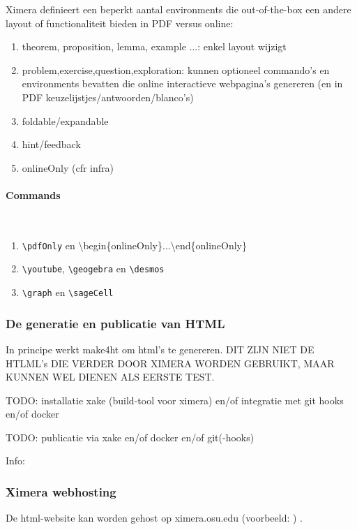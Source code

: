 \documentclass{ximera}
\begin{document}
Ximera definieert een beperkt aantal environments die out-of-the-box een andere layout of functionaliteit bieden in PDF versus online:
\begin{enumerate}
    \item theorem, proposition, lemma, example ...: enkel layout wijzigt
    \item problem,exercise,question,exploration: kunnen optioneel commando's en environments bevatten die online interactieve webpagina's genereren (en in PDF keuzelijstjes/antwoorden/blanco's)
    \item foldable/expandable
    \item hint/feedback
    \item onlineOnly (cfr infra)
\end{enumerate}
    
\paragraph{Commands} \ 

\begin{enumerate}
    \item \verb|\pdfOnly| en \textbackslash begin\{onlineOnly\}...\textbackslash end\{onlineOnly\}
    \item \verb|\youtube|, \verb|\geogebra|  en \verb|\desmos|
    \item \verb|\graph| en \verb|\sageCell|
\end{enumerate}


\subsubsection{De generatie en publicatie van HTML}

In principe werkt make4ht om html's te genereren. DIT ZIJN NIET DE HTLML's DIE VERDER DOOR XIMERA WORDEN GEBRUIKT, MAAR KUNNEN WEL DIENEN ALS EERSTE TEST.


TODO: installatie xake   (build-tool voor ximera) en/of integratie met git hooks en/of docker

TODO: publicatie via xake en/of docker en/of git(-hooks)


Info: 

\subsubsection{Ximera webhosting}

De html-website kan worden gehost op ximera.osu.edu  (voorbeeld: ) . 
\end{document}
